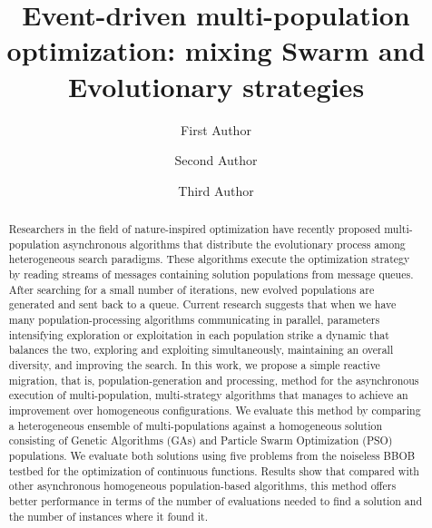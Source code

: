 \documentclass[runningheads]{llncs}
\begin{document}
\title{Event-driven multi-population optimization: mixing Swarm and
  Evolutionary strategies}
\author{First Author \and
Second Author \and
Third Author}
%

%
\maketitle              %
%
\begin{abstract}

Researchers in the field of nature-inspired optimization have recently
proposed multi-population asynchronous algorithms that distribute the
evolutionary process among heterogeneous search paradigms. These
algorithms execute the optimization strategy by reading streams of
messages containing solution populations from message queues. After
searching for a small number of iterations, new evolved populations
are generated and sent back to a queue. Current research suggests that
when we have many population-processing algorithms communicating in
parallel, parameters intensifying exploration or exploitation in each
population strike a dynamic that balances the two, exploring and
exploiting simultaneously, maintaining an overall diversity, and
improving the search.  In this work, we propose a simple reactive
migration, that is, population-generation and processing, method for
the asynchronous execution of multi-population, multi-strategy
algorithms that manages to achieve an improvement over homogeneous
configurations. We evaluate this method by comparing a heterogeneous
ensemble of multi-populations against a homogeneous solution
consisting of Genetic Algorithms (GAs) and Particle Swarm Optimization
(PSO) populations. We evaluate both solutions using five problems from
the noiseless BBOB testbed for the optimization of continuous
functions. Results show that compared with other asynchronous
homogeneous population-based algorithms, this method offers better
performance in terms of the number of evaluations needed to find a
solution and the number of instances where it found it.

\end{abstract}
%
%
%
\end{document}
